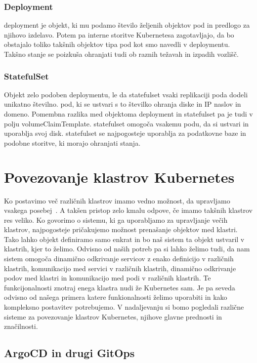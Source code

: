 \documentclass[a4paper, 12pt]{book}
\begin{document}
\subsection{Deployment~\cite{deployment}}
deployment je objekt, ki mu podamo število željenih objektov pod in predlogo za njihovo izdelavo.
Potem pa interne storitve Kubernetesa zagotavljajo, da bo obstajalo toliko takšnih objektov tipa pod kot smo navedli v deploymentu.
Takšno stanje se poizkuša ohranjati tudi ob raznih težavah in izpadih vozlišč.
\subsection{StatefulSet~\cite{statefulset}}
Objekt zelo podoben deploymentu, le da statefulset vsaki replikaciji poda dodeli unikatno številno. 
pod, ki se ustvari s to številko ohranja diske in IP naslov in domeno.
Pomembna razlika med objektoma deployment in statefulset pa je tudi v polju volumeClaimTemplate.
statefulset omogoča vsakemu podu, da si ustvari in uporablja svoj disk.
statefulset se najpogosteje uporablja za podatkovne baze in podobne storitve, ki morajo ohranjati stanja.
\chapter{Povezovanje klastrov Kubernetes }
Ko postavimo več različnih klastrov imamo vedno možnost, da upravljamo vsakega posebej~\cite{difference-multi-cluster}.
A takšen pristop zelo kmalu odpove, če imamo takšnih klastrov res veliko.
Ko govorimo o sistemu, ki ga uporabljamo za upravljanje večih klastrov, najpogosteje pričakujemo možnost prenašanje objektov med klastri.
Tako lahko objekt definiramo samo enkrat in bo naš sistem ta objekt ustvaril v klastrih, kjer to želimo.
Odvisno od naših potreb pa si lahko želimo tudi, da nam sistem omogoča dinamično odkrivanje servicov z enako definicijo v različnih klastrih, komunikacijo med servici v različnih klastrih, dinamično odkrivanje podov med klastri in komunikacijo med podi v različnih klastrih.
Te funkcijonalnosti znotraj enega klastra nudi že Kubernetes sam.
Je pa seveda odvisno od našega primera katere funkionalnosti želimo uporabiti in kako kompleksno postavitev potrebujemo.
V nadaljevanju si bomo pogledali različne sisteme za povezovanje klastrov Kubernetes, njihove glavne prednosti in značilnosti.
  \section{ArgoCD in drugi GitOps}
\end{document}
